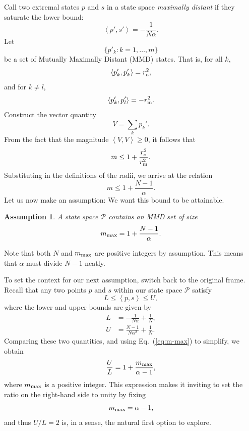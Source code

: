 \documentclass[aps,pra,superscriptaddress,10pt,tightenlines,twocolumn,nofootinbib]{revtex4}
\newtheorem{assump}{Assumption}
\theoremstyle{remark}
\newcommand{\be}{\begin{equation}}
\newcommand{\ee}{\end{equation}}
\newcommand{\ro}{r_{\rm{o}}}
\newcommand{\rmid}{r_{\rm m}}
\newcommand{\cP}{\mathcal{P}}
\newcommand{\inprod}[2]{{\left\langle #1 , #2 \right\rangle}}
\begin{document}
Call two extremal states $p$ and $s$ in a state space \emph{maximally distant} if
they saturate the lower bound:
\be
\inprod{p'}{s'} = -\frac{1}{N\alpha}.
\ee
Let
\begin{equation}
\{p'_k : k = 1,\ldots,m \}
\end{equation}
be a set of Mutually Maximally Distant (MMD) states.  That is, for all $k$,
\begin{equation}
\inprod{p_k'}{p_k'} = \ro^2,
\end{equation}
and for $k \neq l$,
\begin{equation}
\inprod{p_k'}{p_l'} = -\rmid^2.
\end{equation}
Construct the vector quantity
\begin{equation}
V = \sum_k p_k'.
\end{equation}
From the fact that the magnitude $\inprod{V}{V} \geq 0$, it follows that
\begin{equation}
m \leq 1 + \frac{\ro^2}{\rmid^2}.
\end{equation}
Substituting in the definitions of the radii, we arrive at the
relation
\begin{equation}
m \leq 1 + \frac{N-1}{\alpha}.
\end{equation}
Let us now make an assumption:  We want this bound to be attainable.

\begin{assump}
\label{assump:m-max}
A state space $\cP$ contains an MMD set of size
\be
m_{\rm max} = 1 + \frac{N-1}{\alpha}.
\label{eq:m-max}
\end{equation}
\end{assump}
Note that both $N$ and $m_{\rm max}$ are positive integers by
assumption.  This means that $\alpha$ must divide $N-1$ neatly. %

To set the context for our next assumption, switch back to the
original frame.  Recall that any two points $p$ and $s$ within our
state space $\cP$ satisfy
\be
L \leq \inprod{p}{s} \leq U,
\ee
where the lower and upper bounds are given by
\begin{align}
L &= -\frac{1}{N\alpha} + \frac{1}{N}, \\
U &= \frac{N-1}{N\alpha^2} + \frac{1}{N}.
\end{align}
Comparing these two quantities, and using Eq.~(\ref{eq:m-max}) to
simplify, we obtain
\begin{equation}
\frac{U}{L} = 1 + \frac{m_{\rm max}}{\alpha - 1},
\end{equation}
where $m_{\rm max}$ is a positive integer.  This expression makes it
inviting to set the ratio on the right-hand side to unity by fixing
\begin{equation}
m_{\rm max} = \alpha - 1,
\end{equation}
and thus $U/L = 2$ is, in a sense, the natural first option to
explore.
\end{document}
